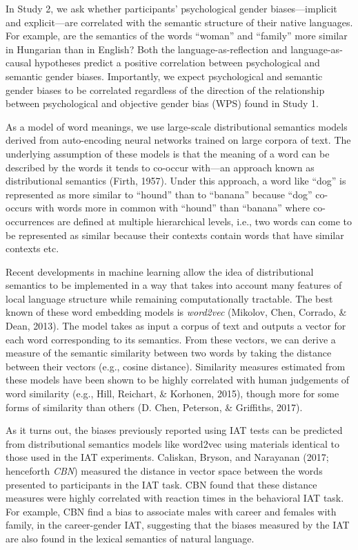 \documentclass[10pt, letterpaper]{article}
\begin{document}
In Study 2, we ask whether participants' psychological gender
biases---implicit and explicit---are correlated with the semantic
structure of their native languages. For example, are the semantics of
the words ``woman'' and ``family'' more similar in Hungarian than in
English? Both the language-as-reflection and language-as-causal
hypotheses predict a positive correlation between psychological and
semantic gender biases. Importantly, we expect psychological and
semantic gender biases to be correlated regardless of the direction of
the relationship between psychological and objective gender bias (WPS)
found in Study 1.

As a model of word meanings, we use large-scale distributional semantics
models derived from auto-encoding neural networks trained on large
corpora of text. The underlying assumption of these models is that the
meaning of a word can be described by the words it tends to co-occur
with---an approach known as distributional semantics (Firth, 1957).
Under this approach, a word like ``dog'' is represented as more similar
to ``hound'' than to ``banana'' because ``dog'' co-occurs with words
more in common with ``hound'' than ``banana'' where co-occurrences are
defined at multiple hierarchical levels, i.e., two words can come to be
represented as similar because their contexts contain words that have
similar contexts etc.

Recent developments in machine learning allow the idea of distributional
semantics to be implemented in a way that takes into account many
features of local language structure while remaining computationally
tractable. The best known of these word embedding models is
\emph{word2vec} (Mikolov, Chen, Corrado, \& Dean, 2013). The model takes
as input a corpus of text and outputs a vector for each word
corresponding to its semantics. From these vectors, we can derive a
measure of the semantic similarity between two words by taking the
distance between their vectors (e.g., cosine distance). Similarity
measures estimated from these models have been shown to be highly
correlated with human judgements of word similarity (e.g., Hill,
Reichart, \& Korhonen, 2015), though more for some forms of similarity
than others (D. Chen, Peterson, \& Griffiths, 2017).

As it turns out, the biases previously reported using IAT tests can be
predicted from distributional semantics models like word2vec using
materials identical to those used in the IAT experiments. Caliskan,
Bryson, and Narayanan (2017; henceforth \emph{CBN}) measured the
distance in vector space between the words presented to participants in
the IAT task. CBN found that these distance measures were highly
correlated with reaction times in the behavioral IAT task. For example,
CBN find a bias to associate males with career and females with family,
in the career-gender IAT, suggesting that the biases measured by the IAT
are also found in the lexical semantics of natural language.
\end{document}
